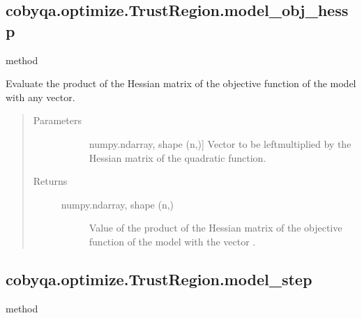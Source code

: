 \documentclass[letterpaper,10pt,english]{sphinxmanual}
\begin{document}
\begin{fulllineitems}
\subsection{cobyqa.optimize.TrustRegion.model\_obj\_hessp}
\label{\detokenize{refs/generated/cobyqa.optimize.TrustRegion.model_obj_hessp:cobyqa-optimize-trustregion-model-obj-hessp}}\label{\detokenize{refs/generated/cobyqa.optimize.TrustRegion.model_obj_hessp::doc}}
\sphinxAtStartPar
method

\begin{fulllineitems}
\label{\detokenize{refs/generated/cobyqa.optimize.TrustRegion.model_obj_hessp:cobyqa.optimize.TrustRegion.model_obj_hessp}}
\sphinxAtStartPar
Evaluate the product of the Hessian matrix of the objective function of
the model with any vector.
\begin{quote}\begin{description}
\item[{Parameters}] \leavevmode\begin{description}
\item[{}] \leavevmode{[}numpy.ndarray, shape (n,){]}
\sphinxAtStartPar
Vector to be left\sphinxhyphen{}multiplied by the Hessian matrix of the quadratic
function.

\end{description}

\item[{Returns}] \leavevmode\begin{description}
\item[{numpy.ndarray, shape (n,)}] \leavevmode
\sphinxAtStartPar
Value of the product of the Hessian matrix of the objective function
of the model with the vector .

\end{description}

\end{description}\end{quote}

\end{fulllineitems}



\subsection{cobyqa.optimize.TrustRegion.model\_step}
\label{\detokenize{refs/generated/cobyqa.optimize.TrustRegion.model_step:cobyqa-optimize-trustregion-model-step}}\label{\detokenize{refs/generated/cobyqa.optimize.TrustRegion.model_step::doc}}
\sphinxAtStartPar
method


\end{fulllineitems}
\end{document}
